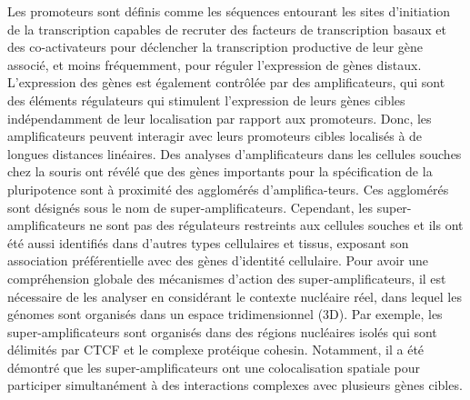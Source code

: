 		Les promoteurs sont d\'efinis comme les s\'equences entourant les sites d'initiation de la transcription capables de recruter des facteurs de transcription basaux et des co-activateurs pour d\'eclencher la transcription productive de leur g\`ene associ\'e, et moins fr\'equemment, pour r\'eguler l'expression de g\`enes distaux. L'expression des g\`enes est \'egalement contr\^ol\'ee par des amplificateurs, qui sont des \'el\'ements r\'egulateurs qui stimulent l'expression de leurs g\`enes cibles ind\'ependamment de leur localisation par rapport aux promoteurs. Donc, les amplificateurs peuvent interagir avec leurs promoteurs cibles localis\'es \`a de longues distances lin\'eaires. Des analyses d'amplificateurs dans les cellules souches chez la souris ont r\'ev\'el\'e que des g\`enes importants pour la sp\'ecification de la pluripotence sont \`a proximit\'e des agglom\'er\'es d'amplifica-teurs. Ces agglom\'er\'es sont d\'esign\'es sous le nom de super-amplificateurs. Cependant, les super-amplificateurs ne sont pas des r\'egulateurs restreints aux cellules souches et ils ont \'et\'e aussi identifi\'es dans d'autres types cellulaires et tissus, exposant son association pr\'ef\'erentielle avec des g\`enes d'identit\'e cellulaire. Pour avoir une compr\'ehension globale des m\'ecanismes d'action des super-amplificateurs, il est n\'ecessaire de les analyser en consid\'erant le contexte nucl\'eaire r\'eel, dans lequel les g\'enomes sont organis\'es dans un espace tridimensionnel (3D). Par exemple, les super-amplificateurs sont organis\'es dans des r\'egions nucl\'eaires isol\'es qui sont d\'elimit\'es par CTCF et le complexe prot\'eique cohesin. Notamment, il a \'et\'e d\'emontr\'e que les super-amplificateurs ont une colocalisation spatiale pour participer simultan\'ement \`a des interactions complexes avec plusieurs g\`enes cibles.\\

